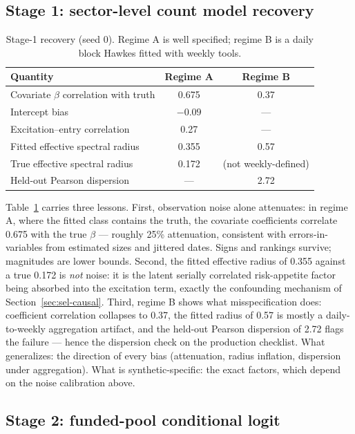 \subsection{Stage 1: sector-level count model recovery}
\label{sec:sel-stage1}

\begin{table}[htbp]
\centering
\small
\begin{tabular}{lcc}
\toprule
Quantity & Regime A & Regime B \\
\midrule
Covariate $\beta$ correlation with truth & 0.675 & 0.37 \\
Intercept bias & $-0.09$ & --- \\
Excitation--entry correlation & 0.27 & --- \\
Fitted effective spectral radius & 0.355 & 0.57 \\
True effective spectral radius & 0.172 & (not weekly-defined) \\
Held-out Pearson dispersion & --- & 2.72 \\
\bottomrule
\end{tabular}
\caption{Stage-1 recovery (seed 0). Regime A is well specified; regime B is a daily block Hawkes fitted
with weekly tools.}
\label{tab:sel-stage1}
\end{table}

Table~\ref{tab:sel-stage1} carries three lessons. First, observation noise alone attenuates: in regime A,
where the fitted class contains the truth, the covariate coefficients correlate 0.675 with the true $\beta$
--- roughly 25\% attenuation, consistent with errors-in-variables from estimated sizes and jittered dates.
Signs and rankings survive; magnitudes are lower bounds. Second, the fitted effective radius of 0.355
against a true 0.172 is \emph{not} noise: it is the latent serially correlated risk-appetite factor being
absorbed into the excitation term, exactly the confounding mechanism of Section~\ref{sec:sel-causal}. Third,
regime B shows what misspecification does: coefficient correlation collapses to 0.37, the fitted radius of
0.57 is mostly a daily-to-weekly aggregation artifact, and the held-out Pearson dispersion of 2.72 flags the
failure --- hence the dispersion check on the production checklist. What generalizes: the direction of every
bias (attenuation, radius inflation, dispersion under aggregation). What is synthetic-specific: the exact
factors, which depend on the noise calibration above.

\subsection{Stage 2: funded-pool conditional logit}
\label{sec:sel-choice}

